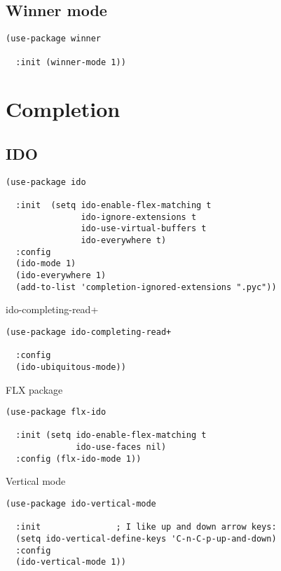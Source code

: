 \documentclass[12pt]{article}
\begin{document}
\subsection{Winner mode}
\label{sec:org07fb807}

\begin{verbatim}
(use-package winner

  :init (winner-mode 1))
\end{verbatim}

\section{Completion}
\label{sec:org5e25cec}
\subsection{IDO}
\label{sec:orgd7952c0}

\begin{verbatim}
(use-package ido

  :init  (setq ido-enable-flex-matching t
               ido-ignore-extensions t
               ido-use-virtual-buffers t
               ido-everywhere t)
  :config
  (ido-mode 1)
  (ido-everywhere 1)
  (add-to-list 'completion-ignored-extensions ".pyc"))

\end{verbatim}
ido-completing-read+
\begin{verbatim}
(use-package ido-completing-read+

  :config
  (ido-ubiquitous-mode))
\end{verbatim}

FLX package
\begin{verbatim}
(use-package flx-ido

  :init (setq ido-enable-flex-matching t
              ido-use-faces nil)
  :config (flx-ido-mode 1))

\end{verbatim}

Vertical mode 
\begin{verbatim}
(use-package ido-vertical-mode

  :init               ; I like up and down arrow keys:
  (setq ido-vertical-define-keys 'C-n-C-p-up-and-down)
  :config
  (ido-vertical-mode 1))

\end{verbatim}
\end{document}
